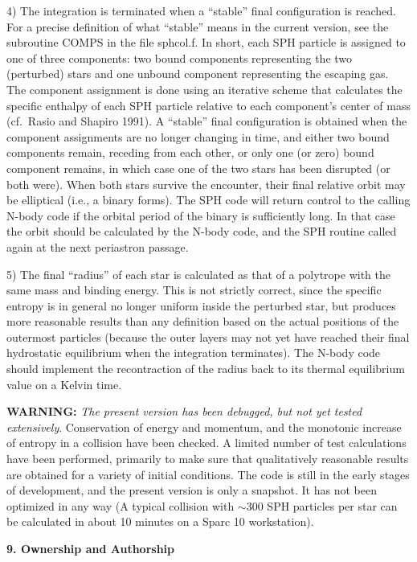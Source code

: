 4) The integration is terminated when a ``stable'' final configuration
is reached. For a precise definition of what ``stable'' means in the
current version, see the subroutine COMPS in the file sphcol.f. In short,
each SPH particle is assigned to one of three components: two bound 
components representing the two (perturbed) stars and one unbound
component representing the escaping gas. The component assignment is
done using an iterative scheme that calculates the specific enthalpy of
each SPH particle relative to each component's center of mass 
(cf.~Rasio and Shapiro 1991). A ``stable'' final configuration is
obtained when the component assignments are no longer changing in time,
and either two bound components remain, receding from each other, or only
one (or zero) bound component remains, in which case one of the two stars
has been disrupted (or both were). When both stars survive the encounter,
their final relative orbit may be elliptical (i.e., a binary forms). The SPH code
will return control to the calling N-body code if the orbital period of the
binary is sufficiently long. In that case the orbit should be calculated
by the N-body code, and the SPH routine called again at the next periastron
passage.  

5) The final ``radius'' of each star is calculated as that of a polytrope
with the same mass and binding energy. This is not strictly correct, since
the specific entropy is in general no longer uniform inside the perturbed
star, but produces more reasonable results than any definition based on the
actual positions of the outermost particles (because the outer layers may
not yet have reached their final hydrostatic equilibrium when the integration
terminates). The N-body code should implement the recontraction of the radius
back to its thermal equilibrium value on a Kelvin time.    

{\bf WARNING:\/} {\it The present version has been debugged, but not yet 
tested extensively\/}. Conservation of energy and momentum, and the
monotonic increase of entropy in a collision have been checked. A limited 
number of test calculations have been performed, primarily to make sure that 
qualitatively reasonable results are obtained for a variety of initial conditions.  
The code is still in the early stages of development, and the present
version is only a snapshot. It has not been optimized in any way
(A typical collision with $\sim300$ SPH particles per star can be calculated 
in about 10 minutes on a Sparc 10 workstation).

\null\bigskip
\centerline{\bf 9. Ownership and Authorship}
\medskip

